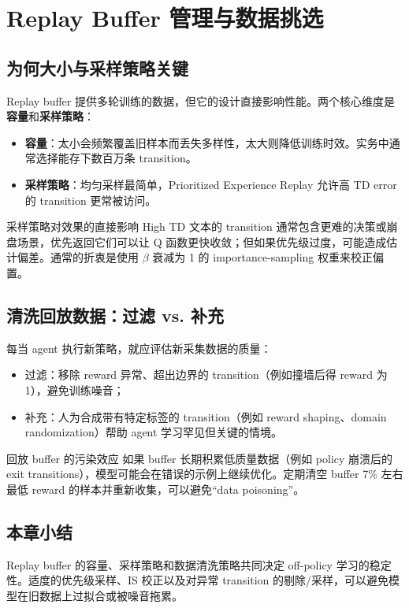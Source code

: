 \section{Replay Buffer 管理与数据挑选}

\subsection{为何大小与采样策略关键}

Replay buffer 提供多轮训练的数据，但它的设计直接影响性能。两个核心维度是\textbf{容量}和\textbf{采样策略}：

\begin{itemize}
    \item \textbf{容量}：太小会频繁覆盖旧样本而丢失多样性，太大则降低训练时效。实务中通常选择能存下数百万条 transition。
    \item \textbf{采样策略}：均匀采样最简单，Prioritized Experience Replay 允许高 TD error 的 transition 更常被访问。
\end{itemize}

\begin{knowledgebox}{采样策略对效果的直接影响}
High TD 文本的 transition 通常包含更难的决策或崩盘场景，优先返回它们可以让 Q 函数更快收敛；但如果优先级过度，可能造成估计偏差。通常的折衷是使用 $\beta$ 衰减为 1 的 importance-sampling 权重来校正偏置。
\end{knowledgebox}

\subsection{清洗回放数据：过滤 vs. 补充}

每当 agent 执行新策略，就应评估新采集数据的质量：

\begin{itemize}
    \item 过滤：移除 reward 异常、超出边界的 transition（例如撞墙后得 reward 为 1），避免训练噪音；
    \item 补充：人为合成带有特定标签的 transition（例如 reward shaping、domain randomization）帮助 agent 学习罕见但关键的情境。
\end{itemize}

\begin{warningbox}{回放 buffer 的污染效应}
如果 buffer 长期积累低质量数据（例如 policy 崩溃后的 exit transitions），模型可能会在错误的示例上继续优化。定期清空 buffer 7\% 左右最低 reward 的样本并重新收集，可以避免“data poisoning”。
\end{warningbox}

\subsection{本章小结}

Replay buffer 的容量、采样策略和数据清洗策略共同决定 off-policy 学习的稳定性。适度的优先级采样、IS 校正以及对异常 transition 的剔除/采样，可以避免模型在旧数据上过拟合或被噪音拖累。

